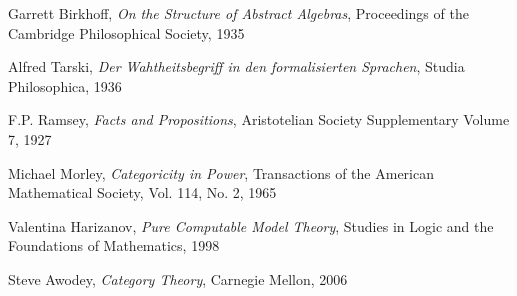 \documentclass{article}
\begin{document}
\begin{thebibliography}{99}
    Garrett Birkhoff,
    \emph{On the Structure of Abstract Algebras},
    Proceedings of the Cambridge Philosophical Society,
    1935

    Alfred Tarski,
    \emph{Der Wahtheitsbegriff in den formalisierten Sprachen},
    Studia Philosophica,
    1936

    F.P. Ramsey,
    \emph{Facts and Propositions},
    Aristotelian Society Supplementary Volume 7,
    1927

    Michael Morley,
    \emph{Categoricity in Power},
    Transactions of the American Mathematical Society, Vol. 114, No. 2,
    1965

    Valentina Harizanov,
    \emph{Pure Computable Model Theory},
    Studies in Logic and the Foundations of Mathematics,
    1998

    Steve Awodey,
    \emph{Category Theory},
    Carnegie Mellon,
    2006

\end{thebibliography}

\end{document}
